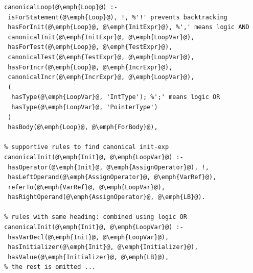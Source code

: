 \begin{lstlisting}[basicstyle=\ttfamily\footnotesize,
float=h, caption={Prolog specification of an OpenMP canonical loop
(italic upper-case for variables, lower-case for properties)},
escapechar=@, 
 label=code:iscl]
% top level rule to find canonical loop
canonicalLoop(@\emph{Loop}@) :- 
 isForStatement(@\emph{Loop}@), !, %'!' prevents backtracking
 hasForInit(@\emph{Loop}@, @\emph{InitExpr}@), %',' means logic AND
 canonicalInit(@\emph{InitExpr}@, @\emph{LoopVar}@),
 hasForTest(@\emph{Loop}@, @\emph{TestExpr}@),
 canonicalTest(@\emph{TestExpr}@, @\emph{LoopVar}@),
 hasForIncr(@\emph{Loop}@, @\emph{IncrExpr}@),
 canonicalIncr(@\emph{IncrExpr}@, @\emph{LoopVar}@),
 (
  hasType(@\emph{LoopVar}@, 'IntType'); %';' means logic OR 
  hasType(@\emph{LoopVar}@, 'PointerType')
 )
 hasBody(@\emph{Loop}@, @\emph{ForBody}@),

% supportive rules to find canonical init-exp 
canonicalInit(@\emph{Init}@, @\emph{LoopVar}@) :-
 hasOperator(@\emph{Init}@, @\emph{AssignOperator}@), !,
 hasLeftOperand(@\emph{AssignOperator}@, @\emph{VarRef}@),
 referTo(@\emph{VarRef}@, @\emph{LoopVar}@),
 hasRightOperand(@\emph{AssignOperator}@, @\emph{LB}@).

% rules with same heading: combined using logic OR
canonicalInit(@\emph{Init}@, @\emph{LoopVar}@) :-
 hasVarDecl(@\emph{Init}@, @\emph{LoopVar}@), 
 hasInitializer(@\emph{Init}@, @\emph{Initializer}@),
 hasValue(@\emph{Initializer}@, @\emph{LB}@),	
% the rest is omitted ...
\end{lstlisting} 

